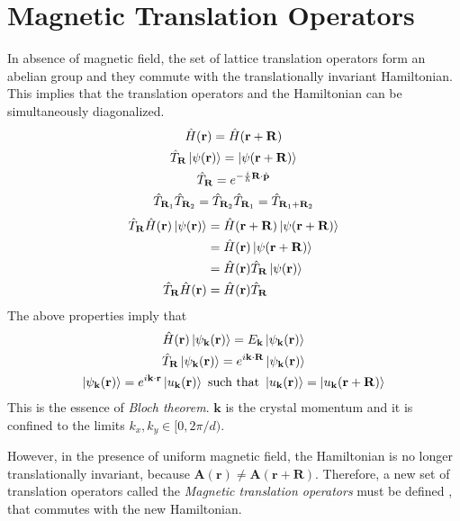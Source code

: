 \section{Magnetic Translation Operators}
In absence of magnetic field, the set of lattice translation operators form an abelian group and they commute with the translationally invariant Hamiltonian. This implies that the translation operators 
and the Hamiltonian can be simultaneously diagonalized.
\begin{gather}
\hat{H}(\mathbf{r}) = \hat{H}(\mathbf{r} + \mathbf{R}) \nonumber \\
 \hat{T}_{\mathbf{R}}\ket{\psi(\mathbf{r})} = \ket{\psi(\mathbf{r} + \mathbf{R})} \\
 \hat{T}_{\mathbf{R}} = e^{-\frac{i}{\hbar}\mathbf{R}\cdot\hat{\mathbf{p}}} \\
 \hat{T}_{\mathbf{R}_1}\hat{T}_{\mathbf{R}_2} = \hat{T}_{\mathbf{R}_2}\hat{T}_{\mathbf{R}_1} = \hat{T}_{\mathbf{R}_1 + \mathbf{R}_2}
\end{gather}
\begin{align}
 \hat{T}_{\mathbf{R}}\hat{H}(\mathbf{r})\ket{\psi(\mathbf{r})} &= \hat{H}(\mathbf{r} + \mathbf{R})\ket{\psi(\mathbf{r} + \mathbf{R})} \nonumber \\
 &= \hat{H}(\mathbf{r})\ket{\psi(\mathbf{r} + \mathbf{R})} \nonumber \\
 &= \hat{H}(\mathbf{r})\hat{T}_{\mathbf{R}}\ket{\psi({\mathbf{r})}} \nonumber \\
 \hat{T}_{\mathbf{R}}\hat{H}(\mathbf{r}) &= \hat{H}(\mathbf{r})\hat{T}_{\mathbf{R}}
\end{align} The above properties imply that \cite{ashcroft2010solid, snoke2009solid, jain2007composite}
\begin{gather}
 \hat{H}(\mathbf{r})\ket{\psi_{\mathbf{k}}(\mathbf{r})} = E_{\mathbf{k}}\ket{\psi_{\mathbf{k}}(\mathbf{r})} \\
 \hat{T}_{\mathbf{R}}\ket{\psi_{\mathbf{k}}(\mathbf{r})} = e^{i\mathbf{k}\cdot\mathbf{R}}\ket{\psi_{\mathbf{k}}(\mathbf{r})} \\
 \ket{\psi_{\mathbf{k}}(\mathbf{r})} = e^{i\mathbf{k}\cdot\mathbf{r}}\ket{u_{\mathbf{k}}(\mathbf{r})} \text{ such that } \ket{u_{\mathbf{k}}(\mathbf{r})} = \ket{u_{\mathbf{k}}(\mathbf{r} + \mathbf{R})}
\end{gather} This is the essence of \emph{Bloch theorem}. $\mathbf{k}$ is the crystal momentum and it is confined to the limits $k_{x}, k_{y} \in [0, 2\pi/d)$.

However, in the presence of uniform magnetic field, the Hamiltonian is no longer translationally invariant, because $\mathbf{A}(\mathbf{r}) \neq \mathbf{A}(\mathbf{r} + \mathbf{R})$.
Therefore, a new set of translation operators called the \emph{Magnetic translation operators} must be defined \cite{zak1964magnetic,brown1964bloch,fischbeck1970theory,bernevig2013topological,jain2007composite,kohmoto1985topological,florek1997local}, that commutes with the new Hamiltonian.

